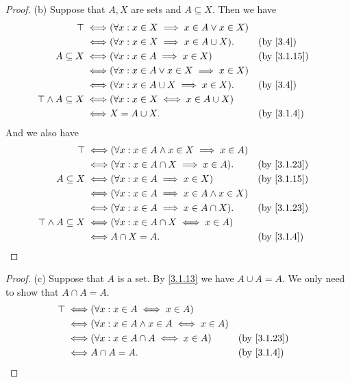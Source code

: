 \begin{proof}{(b)}
	Suppose that \(A, X\) are sets and \(A \subseteq X\).
	Then we have
	\begin{align*}
		\top \iff                     & (\forall x : x \in X \implies x \in A \lor x \in X)                  \\
		\iff                          & (\forall x : x \in X \implies x \in A \cup X).      &  & \by{3.4}    \\
		A \subseteq X \iff            & (\forall x : x \in A \implies x \in X)              &  & \by{3.1.15} \\
		\iff                          & (\forall x : x \in A \lor x \in X \implies x \in X)                  \\
		\iff                          & (\forall x : x \in A \cup X \implies x \in X).      &  & \by{3.4}    \\
		\top \land A \subseteq X \iff & (\forall x : x \in X \iff x \in A \cup X)                            \\
		\iff                          & X = A \cup X.                                       &  & \by{3.1.4}
	\end{align*}
	And we also have
	\begin{align*}
		\top \iff                     & (\forall x : x \in A \land x \in X \implies x \in A)                  \\
		\iff                          & (\forall x : x \in A \cap X \implies x \in A).       &  & \by{3.1.23} \\
		A \subseteq X \iff            & (\forall x : x \in A \implies x \in X)               &  & \by{3.1.15} \\
		\iff                          & (\forall x : x \in A \implies x \in A \land x \in X)                  \\
		\iff                          & (\forall x : x \in A \implies x \in A \cap X).       &  & \by{3.1.23} \\
		\top \land A \subseteq X \iff & (\forall x : x \in A \cap X \iff x \in A)                             \\
		\iff                          & A \cap X = A.                                        &  & \by{3.1.4}
	\end{align*}
\end{proof}

\begin{proof}{(c)}
	Suppose that \(A\) is a set.
	By \cref{3.1.13} we have \(A \cup A = A\).
	We only need to show that \(A \cap A = A\).
	\begin{align*}
		\top \iff & (\forall x : x \in A \iff x \in A)                                \\
		\iff      & (\forall x : x \in A \land x \in A \iff x \in A)                  \\
		\iff      & (\forall x : x \in A \cap A \iff x \in A)        &  & \by{3.1.23} \\
		\iff      & A \cap A = A.                                    &  & \by{3.1.4}
	\end{align*}
\end{proof}

